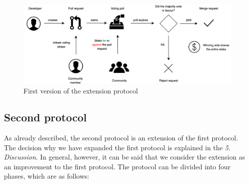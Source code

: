 \documentclass[sigconf]{acmart}
\begin{document}
\begin{figure}[h]
	\centering
	\includegraphics[width=140mm]{images/firstprotocol.png}
	\caption{First version of the extension protocol}
	\label{fig:arch-firstprotocol}
\end{figure}

\subsection{Second protocol}
As already described, the second protocol is an extension of the first protocol. The decision why we have expanded the first 
protocol is explained in the \textit{5. Discussion}. In general, however, it can be said that we consider the extension as an
improvement to the first protocol. The protocol can be divided into four phases, which are as follows: \\
\end{document}
